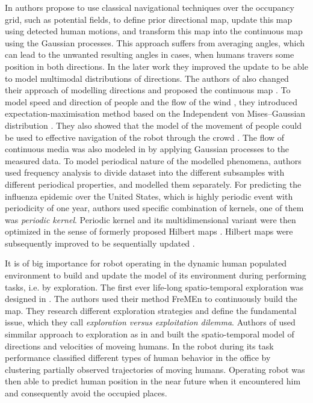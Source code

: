 In \cite{O'Callaghan2011Learning} authors propose to use classical navigational techniques over the occupancy grid, such as potential fields, to define prior directional map, update this map using detected human motions, and transform this map into the continuous map using the Gaussian processes.
This approach suffers from averaging angles, which can lead to the unwanted resulting angles in cases, when humans travers some position in both directions.
In the later work \cite{McCalman2013MultiModal} they improved the update to be able to model multimodal distributions of directions. 
The authors of \cite{kucner2013conditional} also changed their approach of modelling directions and proposed the continuous map \cite{Kucner2016Tell}.  
To model speed and direction of people and the flow of the wind  \cite{kucner2017enabling}, they introduced expectation-maximisation method based on the Independent von Mises–Gaussian distribution \cite{roy2012mixture}.
They also showed that the model of the movement of people could be used to effective navigation of the robot through the crowd \cite{palmieri2017kinodynamic}.
The flow of continuous media was also modeled in \cite{Guizilini2015Nonparametric} by applying Gaussian processes \cite{rasmussen2004gaussian} to the measured data.
To model periodical nature of the modelled phenomena, authors used frequency analysis to divide dataset into the different subsamples with different periodical properties, and modelled them separately.
For predicting the influenza epidemic over the United States, which is highly periodic event with periodicity of one year, authors \cite{Senanayake2016Predicting} used specific combination of kernels, one of them was \textit{periodic kernel}.
Periodic kernel \cite{Tompkins2018Fourier} and its multidimensional variant \cite{Tompkins2018Index} were then optimized in the sense of formerly proposed Hilbert maps \cite{ramos2016hilbert}.
Hilbert maps were subsequently improved to be sequentially updated \cite{Senanayake2017Bayesian}.

It is of big importance for robot operating in the dynamic human populated environment to build and update the model of its environment during performing tasks, i.e. by exploration.
The first ever life-long spatio-temporal exploration was designed in \cite{Krajnik2015Lifelong}.
The authors used their method FreMEn \cite{krajnik2017fremen} to continuously build the map.
They research different exploration strategies and define the fundamental issue, which they call \textit{exploration versus exploitation dilemma}.
Authors of \cite{Molina2019Go} used simmilar approach to exploration as in \cite{Krajnik2015Lifelong} and built the spatio-temporal model of directions and velocities of moveing humans.
In \cite{Duckworth2016Unsupervised} the robot during its task performance classified different types of human behavior in the office by clustering partially observed trajectories of moving humans.
Operating robot was then able to predict human position in the near future when it encountered him and consequently avoid the occupied places. 



